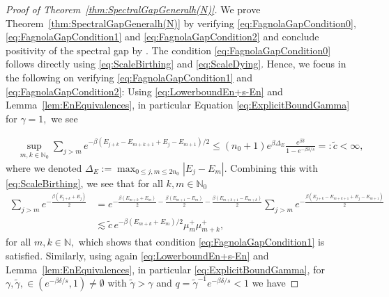 \documentclass[11pt]{amsart}
\newcommand{\1}{\mathbbm{1}}
\newcommand{\N}{\mathbb{N}}
\newcommand{\bin}[1]{}
\theoremstyle{plain}
\theoremstyle{definition}
\theoremstyle{remark}
\numberwithin{equation}{section}
\begin{document}
\begin{proof}[Proof of Theorem~\ref{thm:SpectralGapGeneralh(N)}]
We prove Theorem~\ref{thm:SpectralGapGeneralh(N)} by verifying \eqref{eq:FagnolaGapCondition0}, \eqref{eq:FagnolaGapCondition1} and \eqref{eq:FagnolaGapCondition2} and conclude positivity of the spectral gap by \cite[Theorem 4.2]{carboneFagnola_exponentiall2-convergence_2000}. The condition \eqref{eq:FagnolaGapCondition0} follows directly using \eqref{eq:ScaleBirthing} and \eqref{eq:ScaleDying}.
Hence, we focus in the following on verifying \eqref{eq:FagnolaGapCondition1} and \eqref{eq:FagnolaGapCondition2}: Using \eqref{eq:LowerboundEn+s-En} and Lemma~\ref{lem:EnEquivalences}, in particular Equation \eqref{eq:ExplicitBoundGamma} for $\gamma=1,$ we see 
\bin{\begin{align*}
   \sup_{\substack{m,k\in\N_0\\m+k\ge n_0}}\sum_{j>m} e^{-\beta(E_{j+k}-E_{m+k+1}+E_j -E_{m+1})/2}   \le \sup_{m\in\N_0}\sum_{j\ge m+1} e^{-\beta(E_j -E_{m+1})/2} <\infty
\end{align*}
and therefore, using that also $$\max_{\substack{m,k\in\N_0\\m+k<n_0}} \sum_{j>m} e^{-\beta(E_{j+k}-E_{m+k+1}+E_j -E_{m+1})/2}<\infty $$  we have}
\begin{align}
\label{eq:tildec}
 & \sup_{m,k\in\N_0}\sum_{j>m} e^{-\beta(E_{j+k}-E_{m+k+1}+E_j -E_{m+1})/2}  \le (n_0+1) e^{\beta\Delta_E} \frac{e^{\beta\delta}}{1-e^{-\beta\delta/s}}  =:\tilde c <\infty,
\end{align} 
where we denoted $\Delta_E :=\max_{0\le j,m\le 2n_0} |E_j-E_m|.$
Combining this with \eqref{eq:ScaleBirthing}, we see that for all $k,m\in\N_0$
\begin{align*}
    \sum_{j>m} \!e^{-\frac{\beta(E_{j+k}+E_j)}{2}} &=\! e^{-\frac{\beta(E_{m+k}+E_m)}{2}-\frac{\beta(E_{m+1}-E_m)}{2}-\frac{\beta(E_{m+k+1}-E_{m+k})}{2}}  \sum_{j>m} e^{-\frac{\beta(E_{j+k}-E_{m+k+1}+E_j -E_{m+1})}{2}} \\&\lesssim \tilde c  \,e^{-\beta(E_{m+k}+E_m)/2}\mu^+_m\mu^+_{m+k}, 
\end{align*}
for all $m,k\in\N,$ 
which shows that condition \eqref{eq:FagnolaGapCondition1} is satisfied. Similarly, using again \eqref{eq:LowerboundEn+s-En}
and Lemma~\ref{lem:EnEquivalences}, in particular \eqref{eq:ExplicitBoundGamma}, for $\gamma,\tilde\gamma,\in(e^{-\beta\delta/s},1)\neq \emptyset$ with $\tilde \gamma>\gamma$ and $q= \tilde\gamma^{-1}e^{-\beta\delta/s}<1$ we have


\end{proof}
\end{document}
